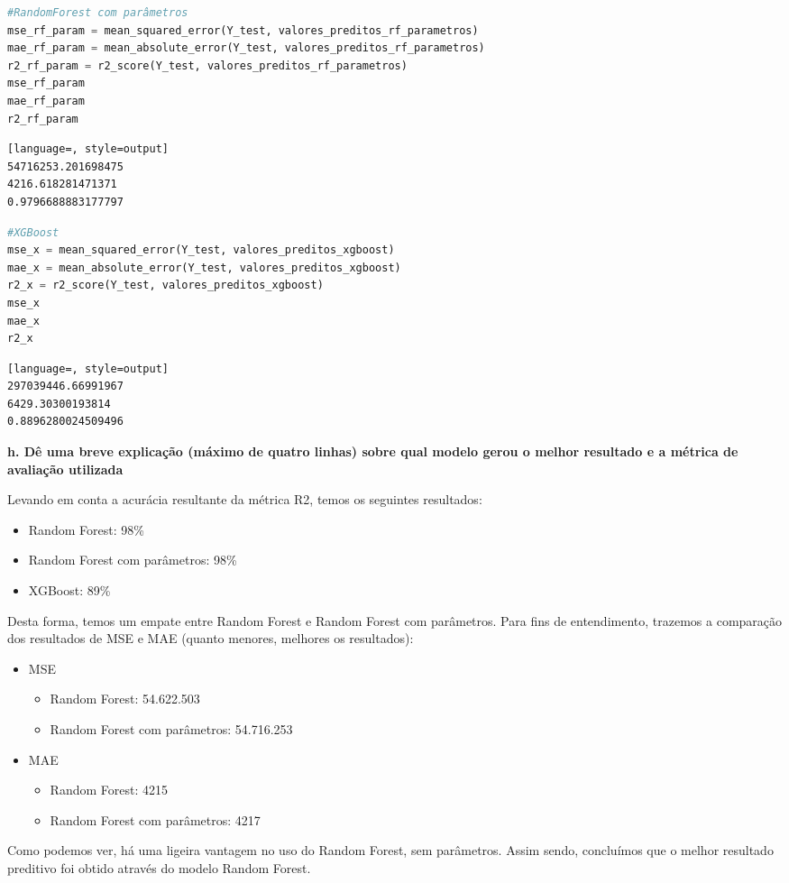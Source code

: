 \begin{lstlisting}[language=Python, style=input]
#RandomForest com parâmetros
mse_rf_param = mean_squared_error(Y_test, valores_preditos_rf_parametros)
mae_rf_param = mean_absolute_error(Y_test, valores_preditos_rf_parametros)
r2_rf_param = r2_score(Y_test, valores_preditos_rf_parametros)
mse_rf_param
mae_rf_param
r2_rf_param
\end{lstlisting}
\begin{lstlisting}[language=, style=output]
54716253.201698475
4216.618281471371
0.9796688883177797
\end{lstlisting}


\begin{lstlisting}[language=Python, style=input]
#XGBoost
mse_x = mean_squared_error(Y_test, valores_preditos_xgboost)
mae_x = mean_absolute_error(Y_test, valores_preditos_xgboost)
r2_x = r2_score(Y_test, valores_preditos_xgboost)
mse_x
mae_x
r2_x
\end{lstlisting}
\begin{lstlisting}[language=, style=output]
297039446.66991967
6429.30300193814
0.8896280024509496
\end{lstlisting}

\begin{adjustwidth}{1em}{}
\textbf{h. Dê uma breve explicação (máximo de quatro linhas) sobre qual modelo gerou o melhor resultado e a métrica de
avaliação utilizada}
\end{adjustwidth}

Levando em conta a acurácia resultante da métrica R2, temos os seguintes resultados:
\begin{itemize}
    \item Random Forest: 98\%
    \item Random Forest com parâmetros: 98\%
    \item XGBoost: 89\%
\end{itemize}
Desta forma, temos um empate entre Random Forest e Random Forest com parâmetros. Para fins de entendimento, trazemos a comparação dos resultados de MSE e MAE (quanto menores, melhores os resultados):

\begin{itemize}
    \item MSE
    \begin{itemize}
        \item Random Forest: 54.622.503
        \item Random Forest com parâmetros: 54.716.253
    \end{itemize}
    \item MAE
    \begin{itemize}
        \item Random Forest: 4215
        \item Random Forest com parâmetros: 4217
    \end{itemize}
\end{itemize}

Como podemos ver, há uma ligeira vantagem no uso do Random Forest, sem parâmetros. Assim sendo, concluímos que o melhor resultado preditivo foi obtido através do modelo Random Forest.